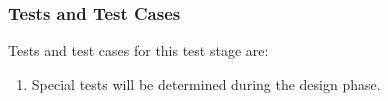 \subsubsection{Tests and Test Cases}
\label{loc:TestsAndTestCases\TestIdName}

Tests and test cases for this test stage are:
\begin{enumerate}[itemindent=5pt,topsep=0pt,itemsep=0pt,partopsep=0pt, parsep=0pt]
	
	\item {\bf \TBD} Special tests will be determined during the design phase.

\end{enumerate}
